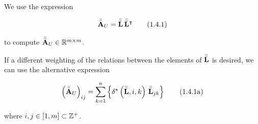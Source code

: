 \documentclass[../ClusteringConnectionsMAIN.tex]{subfiles}
\begin{document}
\begin{flushleft}
\begin{large}

We use the expression

\begin{align}
\bar{\bar{\mathbf{A}}}_U = \bar{\bar{\mathbf{L}}} \, \bar{\bar{\mathbf{L}}}^\intercal \tag{1.4.1}
\end{align}

to compute $\bar{\bar{\mathbf{A}}}_U \in \mathbb{R}^{m \times m}$. \newline

If a different weighting of the relations between the elements of $\bar{\bar{\mathbf{L}}}$ is desired, we can use the alternative expression

\begin{align}
\left( \bar{\bar{\mathbf{A}}}_U \right)_{ij} = \sum_{k = 1}^n \left\{ \delta^\star \left( \bar{\bar{\mathbf{L}}}, i, k \right) \, \bar{\bar{\mathbf{L}}}_{jk} \right\} \tag{1.4.1a}
\end{align}

where $i, j \in \left[ 1, m \right] \subset \mathbb{Z}^+$.







































\end{large}
\end{flushleft}
\end{document}
